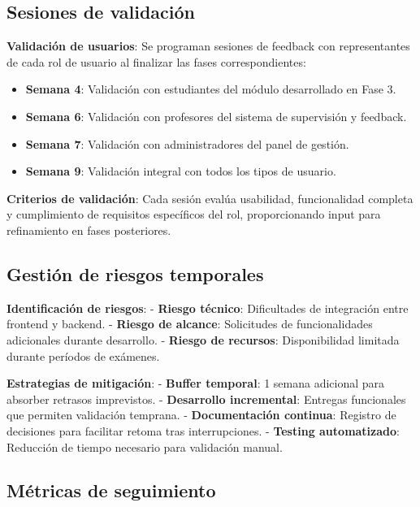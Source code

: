 \documentclass[12pt,a4paper,oneside]{report}
\providecommand{\tightlist}{%
  \setlength{\itemsep}{0pt}\setlength{\parskip}{0pt}}
\begin{document}
\subsection{Sesiones de validación}\label{sesiones-de-validaciuxf3n}

\textbf{Validación de usuarios}: Se programan sesiones de feedback con
representantes de cada rol de usuario al finalizar las fases
correspondientes:

\begin{itemize}
\tightlist
\item
  \textbf{Semana 4}: Validación con estudiantes del módulo desarrollado
  en Fase 3.
\item
  \textbf{Semana 6}: Validación con profesores del sistema de
  supervisión y feedback.
\item
  \textbf{Semana 7}: Validación con administradores del panel de
  gestión.
\item
  \textbf{Semana 9}: Validación integral con todos los tipos de usuario.
\end{itemize}

\textbf{Criterios de validación}: Cada sesión evalúa usabilidad,
funcionalidad completa y cumplimiento de requisitos específicos del rol,
proporcionando input para refinamiento en fases posteriores.

\subsection{Gestión de riesgos
temporales}\label{gestiuxf3n-de-riesgos-temporales}

\textbf{Identificación de riesgos}: - \textbf{Riesgo técnico}:
Dificultades de integración entre frontend y backend. - \textbf{Riesgo
de alcance}: Solicitudes de funcionalidades adicionales durante
desarrollo. - \textbf{Riesgo de recursos}: Disponibilidad limitada
durante períodos de exámenes.

\textbf{Estrategias de mitigación}: - \textbf{Buffer temporal}: 1 semana
adicional para absorber retrasos imprevistos. - \textbf{Desarrollo
incremental}: Entregas funcionales que permiten validación temprana. -
\textbf{Documentación continua}: Registro de decisiones para facilitar
retoma tras interrupciones. - \textbf{Testing automatizado}: Reducción
de tiempo necesario para validación manual.

\subsection{Métricas de seguimiento}\label{muxe9tricas-de-seguimiento}
\end{document}
